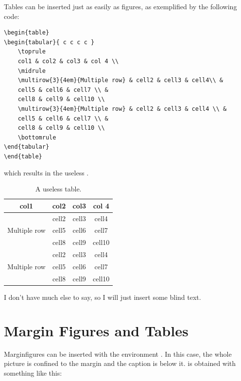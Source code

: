 Tables can be inserted just as easily as figures, as exemplified by the 
following code:

\begin{lstlisting}[caption={Caption of a listing.}]
\begin{table}
\begin{tabular}{ c c c c }
	\toprule
	col1 & col2 & col3 & col 4 \\
	\midrule
	\multirow{3}{4em}{Multiple row} & cell2 & cell3 & cell4\\ &
	cell5 & cell6 & cell7 \\ &
	cell8 & cell9 & cell10 \\
	\multirow{3}{4em}{Multiple row} & cell2 & cell3 & cell4 \\ &
	cell5 & cell6 & cell7 \\ &
	cell8 & cell9 & cell10 \\
	\bottomrule
\end{tabular}
\end{table}
\end{lstlisting}

which results in the useless .

\begin{table}[ht]
\caption[A useless table]{A useless table.}
\begin{tabular}{ c c c c }
	\toprule
	col1 & col2 & col3 & col 4 \\
	\midrule
	\multirow{3}{4em}{Multiple row} & cell2 & cell3 & cell4\\ &
	cell5 & cell6 & cell7 \\ &
	cell8 & cell9 & cell10 \\
	\multirow{3}{4em}{Multiple row} & cell2 & cell3 & cell4 \\ &
	cell5 & cell6 & cell7 \\ &
	cell8 & cell9 & cell10 \\
	\bottomrule
\end{tabular}
\end{table}

I don't have much else to say, so I will just insert some blind text. 
\blindtext

\section{Margin Figures and Tables}

Marginfigures can be inserted with the environment 
. In this case, the whole picture is confined 
to the margin and the caption is below it.  is 
obtained with something like this:

